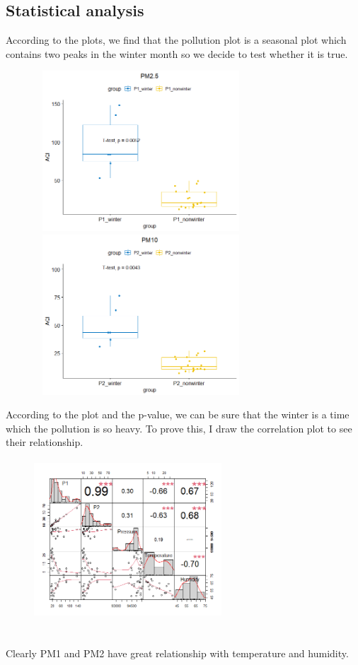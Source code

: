 \documentclass{article}
\begin{document}
\subsection{\textbf{Statistical analysis}}
According to the plots, we find that the pollution plot is a seasonal plot which contains two peaks in the winter month so we decide to test whether it is true.
\begin{figure}[ht]
	\centering
	\includegraphics[width=8cm,height=6cm]{p5.png}
	\includegraphics[width=8cm,height=6cm]{p6.png}
\end{figure}
According to the plot and the p-value, we can be sure that the winter is a time which the pollution is so heavy. To prove this, I draw the correlation plot to see their relationship.
\begin{figure}[ht]
	\centering
	\includegraphics[width=7cm,height=6cm]{p7.png}
\end{figure}\\
Clearly PM1 and PM2 have great relationship with temperature and humidity.
\end{document}
